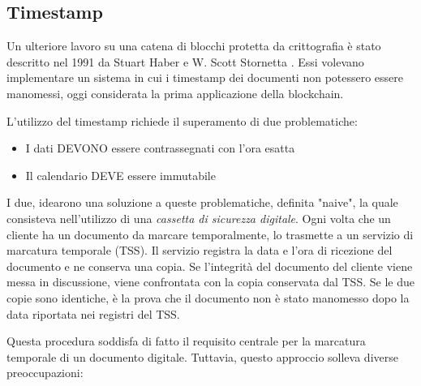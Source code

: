 \subsection{Timestamp}
Un ulteriore lavoro su una catena di blocchi protetta da crittografia è stato descritto nel 1991 da Stuart Haber e W. Scott Stornetta \cite{haber1990time}. Essi volevano implementare un sistema in cui i timestamp dei documenti non potessero essere manomessi, oggi considerata la prima applicazione della blockchain.

L'utilizzo del timestamp richiede il superamento di due problematiche:

\begin{itemize}
  \item I dati DEVONO essere contrassegnati con l'ora esatta
  \item Il calendario DEVE essere immutabile
\end{itemize}

I due, idearono una soluzione a queste problematiche, definita "naive", la quale consisteva nell'utilizzo di una \textit{cassetta di sicurezza digitale}. Ogni volta che un cliente ha un documento da marcare temporalmente, lo trasmette a un servizio di marcatura temporale (TSS). Il servizio registra la data e l'ora di ricezione del documento e ne conserva una copia. Se l'integrità del documento del cliente viene messa in discussione, viene confrontata con la copia conservata dal TSS. Se le due copie sono identiche, è la prova che il documento non è stato manomesso dopo la data riportata nei registri del TSS.

Questa procedura soddisfa di fatto il requisito centrale per la marcatura temporale di un documento digitale. Tuttavia, questo approccio solleva diverse preoccupazioni:

